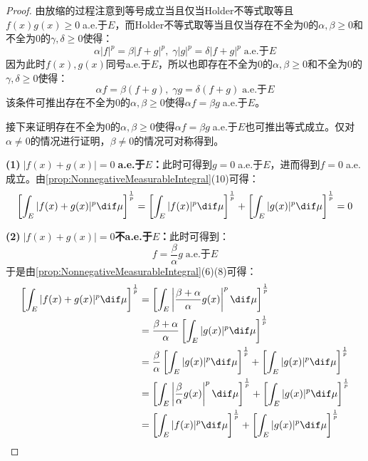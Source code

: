\begin{proof}
	由放缩的过程注意到等号成立当且仅当Holder不等式取等且$f(x)g(x)\geqslant0\;$a.e.于$E$，而Holder不等式取等当且仅当存在不全为$0$的$\alpha,\beta\geqslant0$和不全为$0$的$\gamma,\delta\geqslant0$使得：
	\begin{equation*}
		\alpha|f|^p=\beta|f+g|^p,\;\gamma|g|^p=\delta|f+g|^p\;\text{a.e.于$E$}
	\end{equation*}
	因为此时$f(x),g(x)$同号a.e.于$E$，所以也即存在不全为$0$的$\alpha,\beta\geqslant0$和不全为$0$的$\gamma,\delta\geqslant0$使得：
	\begin{equation*}
		\alpha f=\beta (f+g),\;\gamma g=\delta(f+g)\;\text{a.e.于$E$}
	\end{equation*}
	该条件可推出存在不全为$0$的$\alpha,\beta\geqslant0$使得$\alpha f=\beta g\;$a.e.于$E$。\par
	接下来证明存在不全为$0$的$\alpha,\beta\geqslant0$使得$\alpha f=\beta g\;$a.e.于$E$也可推出等式成立。仅对$\alpha\ne0$的情况进行证明，$\beta\ne0$的情况可对称得到。\par
	\textbf{(1)$\;|f(x)+g(x)|=0\;$a.e.于$E$：}此时可得到$g=0\;$a.e.于$E$，进而得到$f=0\;$a.e.成立。由\cref{prop:NonnegativeMeasurableIntegral}(10)可得：
	\begin{equation*}
		\left[\int_{E}^{}|f(x)+g(x)|^p\dif\mu\right]^\frac{1}{p}=\left[\int_{E}^{}|f(x)|^p\dif\mu\right]^\frac{1}{p}+\left[\int_{E}^{}|g(x)|^p\dif\mu\right]^\frac{1}{p}=0
	\end{equation*}\par
	\textbf{(2)$\;|f(x)+g(x)|=0$不a.e.于$E$：}此时可得到：
	\begin{equation*}
		f=\frac{\beta}{\alpha}g\;\text{a.e.于$E$}
	\end{equation*}
	于是由\cref{prop:NonnegativeMeasurableIntegral}(6)(8)可得：
	\begin{align*}
		\left[\int_{E}^{}|f(x)+g(x)|^p\dif\mu\right]^{\frac{1}{p}}&=\left[\int_{E}^{}\left|\frac{\beta+\alpha}{\alpha}g(x)\right|^p\dif\mu\right]^\frac{1}{p} \\
		&=\frac{\beta+\alpha}{\alpha}\left[\int_{E}^{}|g(x)|^p\dif\mu\right]^\frac{1}{p} \\
		&=\frac{\beta}{\alpha}\left[\int_{E}^{}|g(x)|^p\dif\mu\right]^\frac{1}{p}+\left[\int_{E}^{}|g(x)|^p\dif\mu\right]^\frac{1}{p} \\
		&=\left[\int_{E}\left|\frac{\beta}{\alpha}g(x)\right|^p\dif\mu\right]^{\frac{1}{p}}+\left[\int_{E}^{}|g(x)|^p\dif\mu\right]^\frac{1}{p} \\
		&=\left[\int_{E}^{}|f(x)|^p\dif\mu\right]^\frac{1}{p}+\left[\int_{E}^{}|g(x)|^p\dif\mu\right]^\frac{1}{p}\qedhere
	\end{align*}
\end{proof}
